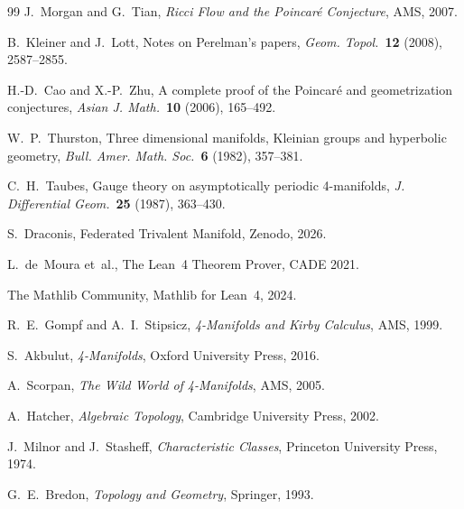 \documentclass[12pt]{article}
\theoremstyle{plain}
\theoremstyle{definition}
\begin{document}
\begin{thebibliography}{99}
J.~Morgan and G.~Tian,
\emph{Ricci Flow and the Poincar\'e Conjecture},
AMS, 2007.

B.~Kleiner and J.~Lott,
Notes on Perelman's papers,
\emph{Geom. Topol.}\ \textbf{12} (2008), 2587--2855.

H.-D.~Cao and X.-P.~Zhu,
A complete proof of the Poincar\'e and geometrization conjectures,
\emph{Asian J. Math.}\ \textbf{10} (2006), 165--492.

W.~P.~Thurston,
Three dimensional manifolds, Kleinian groups and hyperbolic geometry,
\emph{Bull. Amer. Math. Soc.}\ \textbf{6} (1982), 357--381.

C.~H.~Taubes,
Gauge theory on asymptotically periodic 4-manifolds,
\emph{J. Differential Geom.}\ \textbf{25} (1987), 363--430.

S.~Draconis, Federated Trivalent Manifold, Zenodo, 2026.

L.~de~Moura et~al., The Lean~4 Theorem Prover, CADE 2021.

The Mathlib Community, Mathlib for Lean~4, 2024.

R.~E.~Gompf and A.~I.~Stipsicz,
\emph{4-Manifolds and Kirby Calculus},
AMS, 1999.

S.~Akbulut,
\emph{4-Manifolds},
Oxford University Press, 2016.

A.~Scorpan,
\emph{The Wild World of 4-Manifolds},
AMS, 2005.

A.~Hatcher,
\emph{Algebraic Topology},
Cambridge University Press, 2002.

J.~Milnor and J.~Stasheff,
\emph{Characteristic Classes},
Princeton University Press, 1974.

G.~E.~Bredon,
\emph{Topology and Geometry},
Springer, 1993.

\end{thebibliography}
\end{document}
